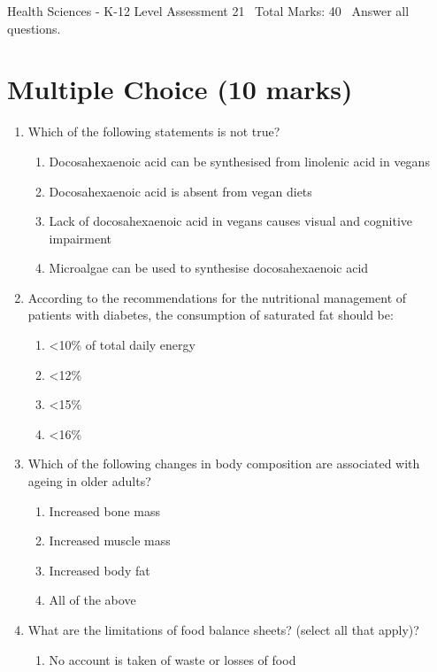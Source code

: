 \documentclass[12pt]{article}
\begin{document}
\begin{center}
Health Sciences - K-12 Level Assessment 21 \
Total Marks: 40 \
Answer all questions.
\end{center}

\section*{Multiple Choice (10 marks)}
\begin{enumerate}[label=\arabic*.]
\item Which of the following statements is not true?
\begin{enumerate}[label=(\alph*)]
    \item Docosahexaenoic acid can be synthesised from linolenic acid in vegans
    \item Docosahexaenoic acid is absent from vegan diets
    \item Lack of docosahexaenoic acid in vegans causes visual and cognitive impairment
    \item Microalgae can be used to synthesise docosahexaenoic acid
\end{enumerate}
\item According to the recommendations for the nutritional management of patients with diabetes, the consumption of saturated fat should be:
\begin{enumerate}[label=(\alph*)]
    \item \textless{}10\% of total daily energy
    \item \textless{}12\%
    \item \textless{}15\%
    \item \textless{}16\%
\end{enumerate}
\item Which of the following changes in body composition are associated with ageing in older adults?
\begin{enumerate}[label=(\alph*)]
    \item Increased bone mass
    \item Increased muscle mass
    \item Increased body fat
    \item All of the above
\end{enumerate}
\item What are the limitations of food balance sheets? (select all that apply)?
\begin{enumerate}[label=(\alph*)]
    \item No account is taken of waste or losses of food

\end{enumerate}
\end{enumerate}
\end{document}
